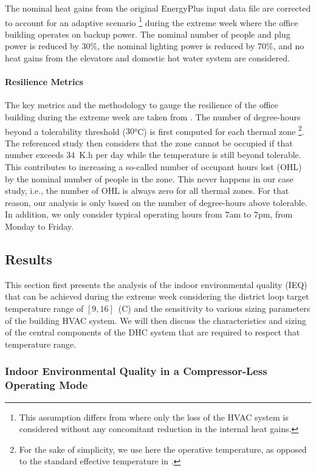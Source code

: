 The nominal heat gains from the original EnergyPlus input data file are corrected to account for an adaptive scenario%
\footnote{This assumption differs from \cite{Mathew2021} where only the loss of the HVAC system is considered without any concomitant reduction in the internal heat gains.}
during the extreme week where the office building operates on backup power. The nominal number of people and plug power is reduced by $30\%$, the nominal lighting power is reduced by $70\%$, and no heat gains from the elevators and domestic hot water system are considered.

\paragraph{Resilience Metrics} \label{par:metrics}

The key metrics and the methodology to gauge the resilience of the office building during the extreme week are taken from \cite{Mathew2021}.
The number of degree-hours beyond a tolerability threshold ($30$°C) is first computed for each thermal zone%
\footnote{For the sake of simplicity, we use here the operative temperature, as opposed to the standard effective temperature in \cite{Mathew2021}.}.
The referenced study then considers that the zone cannot be occupied if that number exceeds $34$~K.h per day while the temperature is still beyond tolerable. This contributes to increasing a so-called number of occupant hours lost (OHL) by the nominal number of people in the zone.
This never happens in our case study, i.e., the number of OHL is always zero for all thermal zones.
For that reason, our analysis is only based on the number of degree-hours above tolerable. In addition, we only consider typical operating hours from $7$am to $7$pm, from Monday to Friday.


\subsection{Results} \label{sec:results}

This section first presents the analysis of the indoor environmental quality (IEQ) that can be achieved during the extreme week considering the district loop target temperature range of $[9, 16]$~(C) and the sensitivity to various sizing parameters of the building HVAC system.
We will then discuss the characteristics and sizing of the central components of the DHC system that are required to respect that temperature range.


\subsubsection{Indoor Environmental Quality in a Compressor-Less Operating Mode} \label{sec:ieq}

